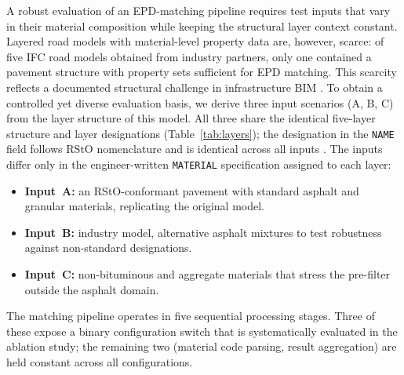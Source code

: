\documentclass[10pt, a4paper, twocolumn]{article}
\begin{document}
A robust evaluation of an EPD-matching pipeline requires test inputs that vary in
their material composition while keeping the structural layer context constant.
Layered road models with material-level property data are, however, scarce: of
five IFC road models obtained from industry partners, only one contained a
pavement structure with property sets sufficient for EPD matching. This scarcity
reflects a documented structural challenge in infrastructure BIM \cite{Kaus.2025}. 
To obtain a controlled yet diverse evaluation basis, we
derive three input scenarios (A, B, C) from the layer structure of this model.
All three share the identical five-layer structure and layer designations
(Table~\ref{tab:layers}); the designation in the \texttt{NAME} field follows RStO
nomenclature and is identical across all inputs \cite{ForschungsgesellschaftfurStraenundVerkehrswesene.V..2024}. The inputs differ only in the
engineer-written \texttt{MATERIAL} specification assigned to each layer:

\begin{itemize}[leftmargin=*, itemsep=2pt, topsep=2pt]
  \item \textbf{Input~A:} an RStO-conformant pavement with standard
        asphalt and granular materials, replicating the original model.
  \item \textbf{Input~B:} industry model, alternative asphalt mixtures to test robustness against non-standard designations.
  \item \textbf{Input~C:} non-bituminous and aggregate materials that stress the
        pre-filter outside the asphalt domain.
\end{itemize}


The matching pipeline operates in five sequential processing stages. Three of
these expose a binary configuration switch that is systematically evaluated in
the ablation study; the remaining two (material code parsing, result aggregation)
are held constant across all configurations.
\end{document}

